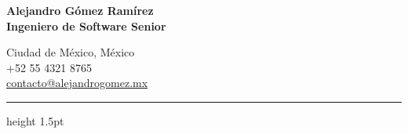 \documentclass[10pt,letterpaper]{article}
\begin{document}
\noindent
\begin{minipage}[t]{0.65\textwidth}
  \vspace{0pt}%
  {\Huge \bfseries \color{primarycolor} Alejandro Gómez Ramírez} \\[6pt]
  {\large \bfseries \color{accentcolor} Ingeniero de Software Senior}
\end{minipage}%
\begin{minipage}[t]{0.35\textwidth}
  \vspace{0pt}%
  \raggedleft
  {\small\color{textdark}
    \faMapMarker \hspace{3pt} Ciudad de México, México \\{}
    \faPhone \hspace{3pt} +52 55 4321 8765 \\{}
    \faEnvelope \hspace{3pt} \href{mailto:contacto@alejandrogomez.mx}{contacto@alejandrogomez.mx} \\{}
  }
\end{minipage}

\vspace{8pt}
{\color{accentcolor}\hrule height 1.5pt}
\vspace{10pt}
\end{document}
